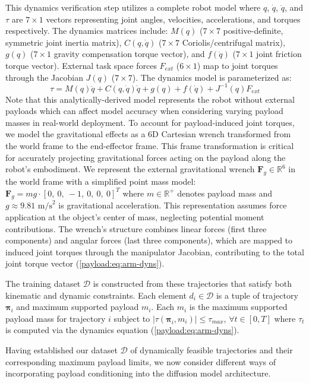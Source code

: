 This dynamics verification step utilizes a complete robot model where $q$, $\dot{q}$, $\ddot{q}$, and $\tau$ are $7\times1$ vectors representing joint angles, velocities, accelerations, and torques respectively.
The dynamics matrices include: $M(q)$ ($7\times7$ positive-definite, symmetric joint inertia matrix), $C(q,\dot{q})$ ($7\times7$ Coriolis/centrifugal matrix), $g(q)$ ($7\times1$ gravity compensation torque vector), and $f(\dot{q})$ ($7\times1$ joint friction torque vector). External task space forces $F_{ext}$ ($6\times1$) map to joint torques through the Jacobian $J(q)$ ($7\times7$).
The dynamics model is parameterized as:
\begin{equation}\label{payload:eq:arm-dyns}
    \tau = M(q)\ddot{q} + C(q, \dot{q})\dot{q} + g(q) + f(\dot{q}) + J^{-1}(q)F_{ext}
\end{equation}
Note that this analytically-derived model represents the robot without external payloads which can affect model accuracy when considering varying payload masses in real-world deployment.
To account for payload-induced joint torques, we model the gravitational effects as a 6D Cartesian wrench transformed from the world frame to the end-effector frame.
This frame transformation is critical for accurately projecting gravitational forces acting on the payload along the robot's embodiment.
We represent the external gravitational wrench $\bm{F}_g \in \mathbb{R}^6$ in the world frame with a simplified point mass model:
$\bm{F}_g = mg \cdot [0,\ 0,\ -1,\ 0,\ 0,\ 0]^T$
where $m \in \mathbb{R}^+$ denotes payload mass and $g \approx 9.81 \text{ m/s}^2$ is gravitational acceleration. This representation assumes force application at the object's center of mass, neglecting potential moment contributions.
The wrench's structure combines linear forces (first three components) and angular forces (last three components), which are
mapped to induced joint torques through the manipulator Jacobian, contributing to the total joint torque vector (\cref{payload:eq:arm-dyns}).

The training dataset $\mathcal{D}$ is constructed from these trajectories that satisfy both kinematic and dynamic constraints. Each element $d_i \in \mathcal{D}$ is a tuple of trajectory $\bm{\pi}_i$ and maximum supported payload $m_i$.
Each $m_i$ is the maximum supported payload mass for trajectory $i$ subject to $|\tau(\bm{\pi}_i, m_i)| \leq \tau_{max}$, $\forall t \in [0,T]$ where $\tau_t$ is computed via the dynamics equation (\cref{payload:eq:arm-dyns}).

Having established our dataset $\mathcal{D}$ of dynamically feasible trajectories and their corresponding maximum payload limits, we now consider different ways of incorporating payload conditioning into the diffusion model architecture.

